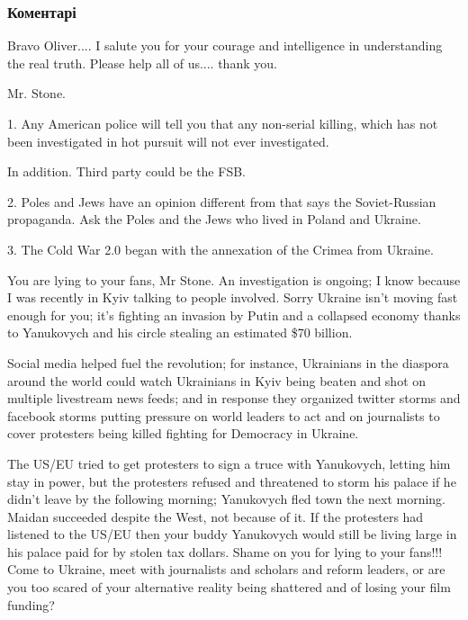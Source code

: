  
 
 
 
 
\subsubsection{Коментарі}

\begin{itemize} %

Bravo Oliver.... I salute you for your courage and intelligence in understanding
the real truth. Please help all of us.... thank you.


Mr. Stone.

1. Any American police will tell you that any non-serial killing, which has not
been investigated in hot pursuit will not ever investigated.

In addition. Third party could be the FSB.

2. Poles and Jews have an opinion different from that says the Soviet-Russian
propaganda. Ask the Poles and the Jews who lived in Poland and Ukraine.

3. The Cold War 2.0 began with the annexation of the Crimea from Ukraine.


You are lying to your fans, Mr Stone. An investigation is ongoing; I know
because I was recently in Kyiv talking to people involved. Sorry Ukraine isn't
moving fast enough for you; it's fighting an invasion by Putin and a collapsed
economy thanks to Yanukovych and his circle stealing an estimated \$70 billion.

Social media helped fuel the revolution; for instance, Ukrainians in the
diaspora around the world could watch Ukrainians in Kyiv being beaten and shot
on multiple livestream news feeds; and in response they organized twitter
storms and facebook storms putting pressure on world leaders to act and on
journalists to cover protesters being killed fighting for Democracy in Ukraine.

The US/EU tried to get protesters to sign a truce with Yanukovych, letting him
stay in power, but the protesters refused and threatened to storm his palace if
he didn't leave by the following morning; Yanukovych fled town the next
morning. Maidan succeeded despite the West, not because of it. If the
protesters had listened to the US/EU then your buddy Yanukovych would still be
living large in his palace paid for by stolen tax dollars. Shame on you for
lying to your fans!!! Come to Ukraine, meet with journalists and scholars and
reform leaders, or are you too scared of your alternative reality being
shattered and of losing your film funding?


\end{itemize}
